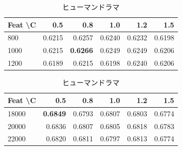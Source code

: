 \documentclass[uplatex, dvipdfmx, 11pt, a4paper, report]{jsbook}
\begin{document}
\begin{table}[H]
    \centering
    \small
    \begin{minipage}[t]{0.48\textwidth}
        \centering
        \caption{純文学}
        \begin{tabular}{l|rrrrr}
            \hline
            Feat \textbackslash C & 0.5 & 0.8 & 1.0 & 1.2 & 1.5 \\ \hline
            800 & 0.6215 & 0.6257 & 0.6240 & 0.6232 & 0.6198 \\
            1000 & 0.6215 & \textbf{0.6266} & 0.6249 & 0.6249 & 0.6206 \\
            1200 & 0.6189 & 0.6215 & 0.6198 & 0.6240 & 0.6206 \\ \hline
        \end{tabular}
    \end{minipage}
    \hfill
    \begin{minipage}[t]{0.48\textwidth}
        \centering
        \caption{ヒューマンドラマ}
        \begin{tabular}{l|rrrrr}
            \hline
            Feat \textbackslash C & 0.5 & 0.8 & 1.0 & 1.2 & 1.5 \\ \hline
            18000 & \textbf{0.6849} & 0.6793 & 0.6807 & 0.6803 & 0.6774 \\
            20000 & 0.6836 & 0.6807 & 0.6805 & 0.6818 & 0.6783 \\
            22000 & 0.6820 & 0.6811 & 0.6797 & 0.6813 & 0.6774 \\ \hline
        \end{tabular}
    \end{minipage}
\end{table}
\end{document}
